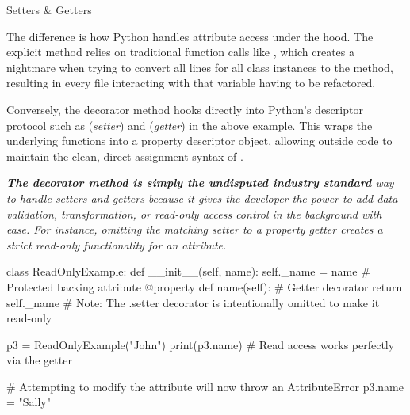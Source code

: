 \documentclass[10pt]{article}
\begin{document}
\begin{core}{Setters \& Getters}
\begin{enumerate}
\begin{pyconsole}
        \end{pyconsole}

      \end{enumerate}

      The difference is how Python handles attribute access under the hood. The explicit method relies on traditional function calls like , which creates a nightmare when trying to convert all  lines for all class instances to the  method, resulting in every file interacting with that variable having to be refactored.

      Conversely, the decorator method hooks directly into Python's descriptor protocol such as  (\textit{setter}) and  (\textit{getter}) in the above example. This wraps the underlying functions into a property descriptor object, allowing outside code to maintain the clean, direct assignment syntax of . 

      \textit{\textbf{The decorator method is simply the undisputed industry standard} way to handle setters and getters because it gives the developer the power to add data validation, transformation, or read-only access control in the background with ease. For instance, omitting the matching setter to a property getter creates a strict read-only functionality for an attribute.}

      \begin{pyconsole}

        class ReadOnlyExample:
            def __init__(self, name):
                self._name = name  # Protected backing attribute
            @property
            def name(self):  # Getter decorator
                return self._name
            # Note: The .setter decorator is intentionally omitted to make it read-only

        p3 = ReadOnlyExample("John")
        print(p3.name)     # Read access works perfectly via the getter

        # Attempting to modify the attribute will now throw an AttributeError
        p3.name = "Sally"

      \end{pyconsole}

    \end{core}
\end{document}
